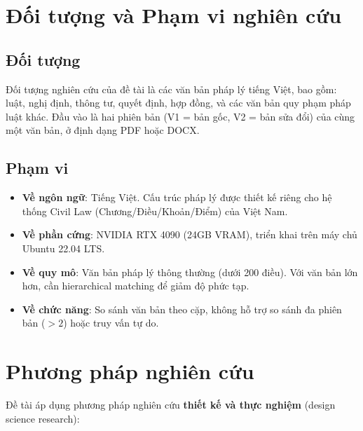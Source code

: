 \section{Đối tượng và Phạm vi nghiên cứu}

\subsection{Đối tượng}

Đối tượng nghiên cứu của đề tài là các văn bản pháp lý tiếng Việt, bao gồm: luật, nghị định, thông tư, quyết định, hợp đồng, và các văn bản quy phạm pháp luật khác. Đầu vào là hai phiên bản (V1 = bản gốc, V2 = bản sửa đổi) của cùng một văn bản, ở định dạng PDF hoặc DOCX.

\subsection{Phạm vi}

\begin{itemize}
    \item \textbf{Về ngôn ngữ}: Tiếng Việt. Cấu trúc pháp lý được thiết kế riêng cho hệ thống Civil Law (Chương/Điều/Khoản/Điểm) của Việt Nam.
    \item \textbf{Về phần cứng}: NVIDIA RTX 4090 (24GB VRAM), triển khai trên máy chủ Ubuntu 22.04 LTS.
    \item \textbf{Về quy mô}: Văn bản pháp lý thông thường (dưới 200 điều). Với văn bản lớn hơn, cần hierarchical matching để giảm độ phức tạp.
    \item \textbf{Về chức năng}: So sánh văn bản theo cặp, không hỗ trợ so sánh đa phiên bản ($> 2$) hoặc truy vấn tự do.
\end{itemize}

\section{Phương pháp nghiên cứu}

Đề tài áp dụng phương pháp nghiên cứu \textbf{thiết kế và thực nghiệm} (design science research):

